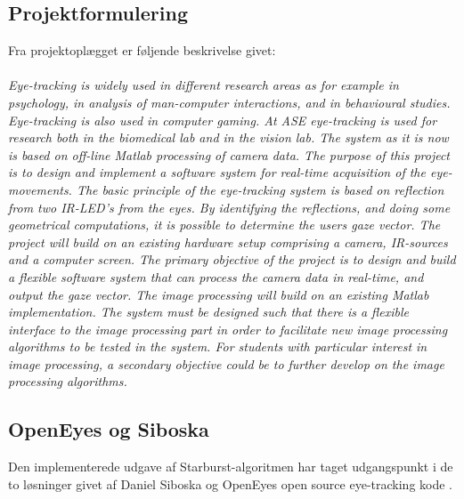\documentclass[rapport.tex]{subfiles}
\begin{document}
	\subsection{Projektformulering}
	Fra projektoplægget er føljende beskrivelse givet:\\
	\\
\textit{	Eye-tracking is widely used in different research areas as for example in psychology, in analysis of man-computer interactions, and in behavioural studies. Eye-tracking is also used in computer gaming. At ASE eye-tracking is used for research both in the biomedical lab and in the vision lab. The system as it is now is based on off-line Matlab processing of camera data. The purpose of this project is to design and implement a software system for real-time acquisition of the eye-movements. The basic principle of the eye-tracking system is based on reflection from two IR-LED’s from the eyes. By identifying the reflections, and doing some geometrical computations, it is possible to determine the users gaze vector. 
	The project will build on an existing hardware setup comprising a camera, IR-sources and a computer screen. The primary objective of the project is to design and build a flexible software system that can process the camera data in real-time, and output the gaze vector. The image processing will build on an existing Matlab implementation. The system must be designed such that there is a flexible interface to the image processing part in order to facilitate new image processing algorithms to be tested in the system. For students with particular interest in image processing, a secondary objective could be to further develop on the image processing algorithms.} 
	\\
	
	\subsection{OpenEyes og Siboska}
	Den implementerede udgave af Starburst-algoritmen har taget udgangspunkt i de to løsninger givet af Daniel Siboska \cite{Siboska} og OpenEyes open source eye-tracking kode \cite{openEyes}.  
	
		
\end{document}

